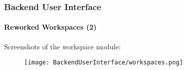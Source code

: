 \begin{frame}[fragile]
	\frametitle{Backend User Interface}
	\framesubtitle{Reworked Workspaces (2)}

	Screenshots of the workspace module:

	\begin{figure}
		\texttt{[image: BackendUserInterface/workspaces.png]}
	\end{figure}

\end{frame}

